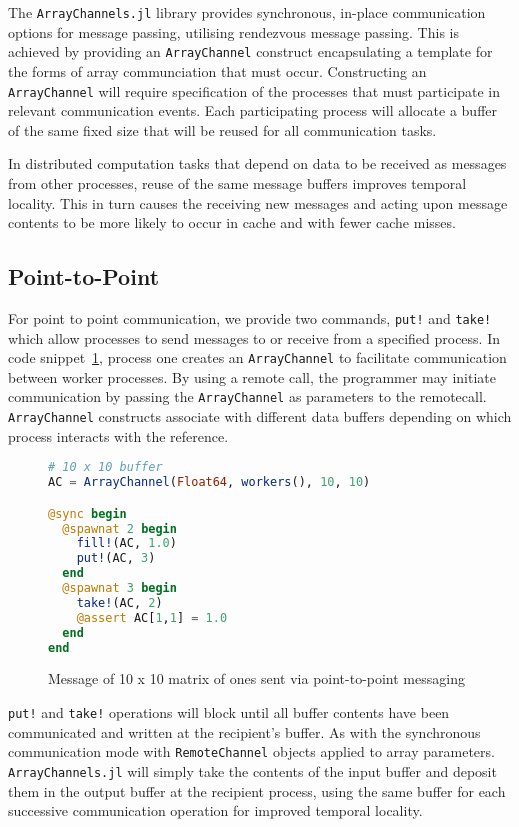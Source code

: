 \label{sec:arraychannels}

The \texttt{ArrayChannels.jl} library provides synchronous, in-place
communication options for message passing, utilising rendezvous message
passing. This is achieved by providing an \texttt{ArrayChannel}
construct encapsulating a template for the forms of array communciation
that must occur. Constructing an \texttt{ArrayChannel} will require
specification of the processes that must participate in relevant
communication events. Each participating process will allocate a buffer
of the same fixed size that will be reused for all communication tasks.

In distributed computation tasks that depend on data to be received as
messages from other processes, reuse of the same message buffers
improves temporal locality. This in turn causes the receiving new
messages and acting upon message contents to be more likely to occur in
cache and with fewer cache misses.

\subsection{Point-to-Point}
\label{sec:p2p}

For point to point communication, we provide two commands, \texttt{put!}
and \texttt{take!} which allow processes to send messages to or receive
from a specified process. In code snippet~\ref{code:put-take}, process
one creates an \texttt{ArrayChannel} to facilitate communication between
worker processes. By using a remote call, the programmer may initiate
communication by passing the \texttt{ArrayChannel} as parameters to the
remotecall. \texttt{ArrayChannel} constructs associate with different
data buffers depending on which process interacts with the reference.

\begin{figure}[htb]
  \begin{lstlisting}[language=Julia]
# 10 x 10 buffer
AC = ArrayChannel(Float64, workers(), 10, 10)

@sync begin
  @spawnat 2 begin
    fill!(AC, 1.0)
    put!(AC, 3)
  end
  @spawnat 3 begin
    take!(AC, 2)
    @assert AC[1,1] = 1.0
  end
end
  \end{lstlisting}
  \caption{Message of 10 x 10 matrix of ones sent via point-to-point messaging}
  \label{code:put-take}
\end{figure}

\texttt{put!} and \texttt{take!} operations will block until all buffer
contents have been communicated and written at the recipient's buffer.
As with the synchronous communication mode with \texttt{RemoteChannel}
objects applied to array parameters. \texttt{ArrayChannels.jl} will
simply take the contents of the input buffer and deposit them in the
output buffer at the recipient process, using the same buffer for each
successive communication operation for improved temporal locality.


